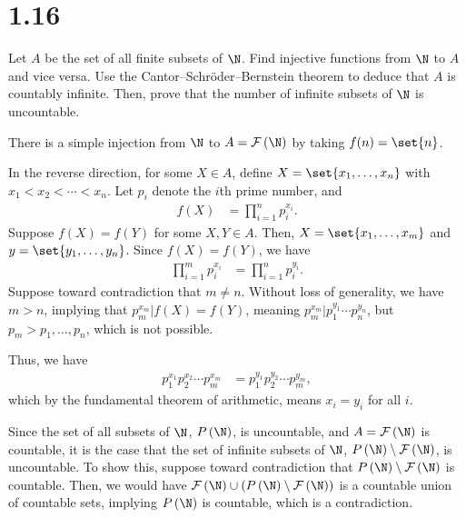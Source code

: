 \documentclass[10pt]{mypackage}
\begin{document}
\section{1.16}%
\begin{problem}
  Let $A$ be the set of all finite subsets of $\N$. Find injective functions from $\N$ to $A$ and vice versa. Use the Cantor--Schröder--Bernstein theorem to deduce that $A$ is countably infinite. Then, prove that the number of infinite subsets of $\N$ is uncountable.
\end{problem}
\begin{solution}
  There is a simple injection from $\N$ to $A = \mathcal{F}\left(\N\right)$ by taking $f(n) = \set{n}$.\newline

  In the reverse direction, for some $X\in A$, define $X = \set{x_1,\dots,x_n}$ with $x_1 < x_2 < \cdots < x_n $. Let $p_i$ denote the $i$th prime number, and
  \begin{align*}
    f(X) &= \prod_{i=1}^{n}p_i^{x_i}.
  \end{align*}
  Suppose $f(X) = f(Y)$ for some $X,Y\in A$. Then, $X = \set{x_1,\dots,x_m}$ and $y = \set{y_1,\dots,y_n}$. Since $f(X) = f(Y)$, we have
  \begin{align*}
    \prod_{i=1}^{m}p_i^{x_i} &= \prod_{i=1}^{n} p_i^{y_i}.
  \end{align*}
  Suppose toward contradiction that $m\neq n$. Without loss of generality, we have $m > n$, implying that $p_m^{x_m}|f(X) = f(Y)$, meaning $p_m^{x_m}|p_1^{y_1}\cdots p_n^{y_n}$, but $p_m > p_1,\dots,p_n$, which is not possible.\newline

  Thus, we have
  \begin{align*}
    p_1^{x_1}p_2^{x_2}\cdots p_m^{x_m} &= p_1^{y_1}p_2^{y_2}\cdots p_m^{y_m},
  \end{align*}
  which by the fundamental theorem of arithmetic, means $x_i = y_i$ for all $i$.\newline

  Since the set of all subsets of $\N$, $P\left(\N\right)$, is uncountable, and $A = \mathcal{F}\left(\N\right)$ is countable, it is the case that the set of infinite subsets of $\N$, $P\left(\N\right) \setminus \mathcal{F}\left(\N\right)$, is uncountable. To show this, suppose toward contradiction that $P\left(\N\right)\setminus \mathcal{F}\left(\N\right)$ is countable. Then, we would have $\mathcal{F}\left(\N\right)\cup \left(P\left(\N\right)\setminus \mathcal{F}\left(\N\right)\right)$ is a countable union of countable sets, implying $P\left(\N\right)$ is countable, which is a contradiction.
\end{solution}
\end{document}
